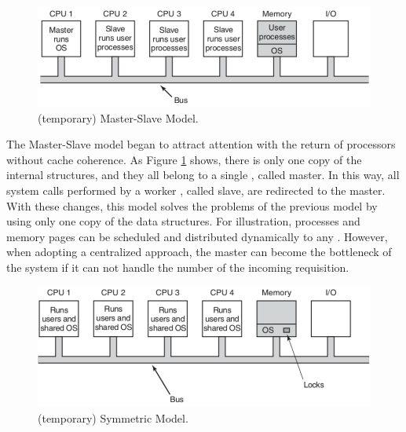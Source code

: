 			\begin{figure}[h]
				\centering
				\includegraphics[width=.8\textwidth]{images/master-slave-os.png}

				\caption{
					(temporary) Master-Slave \os Model.
				}\par
				\label{fig.master_slave_os}
			\end{figure}

			The Master-Slave model began to attract attention with the return of
			processors without cache coherence.
			As Figure \ref{fig.master_slave_os} shows, there is only one copy of
			the internal \os structures, and they all belong to a single \cpu, called master.
			In this way, all system calls performed by a worker \cpu, called slave,
			are redirected to the master.
			With these changes, this model solves the problems of the previous model
			by using only one copy of the data structures.
			For illustration, processes and memory pages can be scheduled and
			distributed dynamically to any \cpus.
			However, when adopting a centralized approach, the master can become
			the bottleneck of the system if it can not handle the number of the
			incoming requisition.

			\begin{figure}[h]
				\centering
				\includegraphics[width=.8\textwidth]{images/smp-os.png}

				\caption{
					(temporary) Symmetric \os Model.
				}\par
				\label{fig.smp_os}
			\end{figure}

